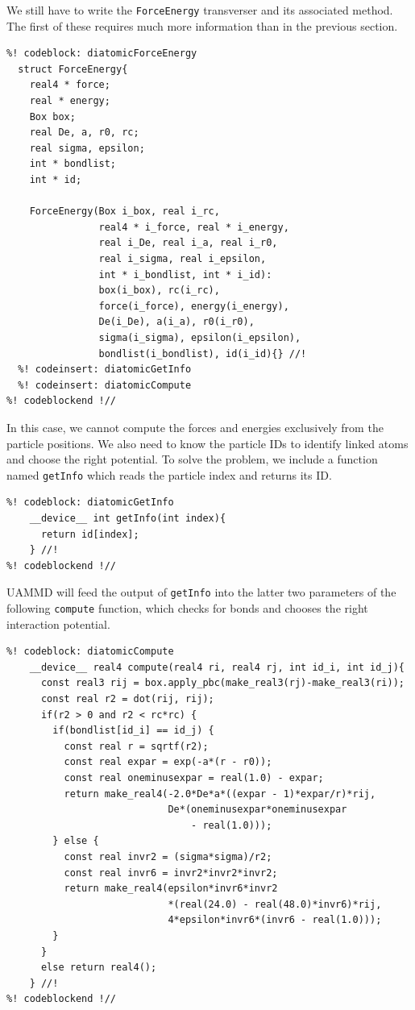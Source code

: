 We still have to write the \texttt{ForceEnergy} transverser and its associated
method. The first of these requires much more information than in the previous
section.
\begin{lstlisting}
%! codeblock: diatomicForceEnergy
  struct ForceEnergy{
    real4 * force;
    real * energy;
    Box box;
    real De, a, r0, rc;
    real sigma, epsilon;
    int * bondlist;
    int * id;

    ForceEnergy(Box i_box, real i_rc,
                real4 * i_force, real * i_energy,
                real i_De, real i_a, real i_r0,
                real i_sigma, real i_epsilon,
                int * i_bondlist, int * i_id):
                box(i_box), rc(i_rc),
                force(i_force), energy(i_energy),
                De(i_De), a(i_a), r0(i_r0),
                sigma(i_sigma), epsilon(i_epsilon),
                bondlist(i_bondlist), id(i_id){} //!
  %! codeinsert: diatomicGetInfo
  %! codeinsert: diatomicCompute
%! codeblockend !//
\end{lstlisting}
In this case, we cannot compute the forces and energies exclusively from the 
particle positions. We also need to know the particle IDs to identify linked
atoms and choose the right potential. To solve the problem, we include a 
function named \texttt{getInfo} which reads the particle index and returns its 
ID.
\begin{lstlisting}
%! codeblock: diatomicGetInfo
    __device__ int getInfo(int index){
      return id[index];
    } //!
%! codeblockend !//
\end{lstlisting}
UAMMD will feed the output of \texttt{getInfo} into the latter two parameters of 
the following \texttt{compute} function, which checks for bonds and chooses the 
right interaction potential.
\begin{lstlisting}
%! codeblock: diatomicCompute
    __device__ real4 compute(real4 ri, real4 rj, int id_i, int id_j){
      const real3 rij = box.apply_pbc(make_real3(rj)-make_real3(ri));
      const real r2 = dot(rij, rij);
      if(r2 > 0 and r2 < rc*rc) {
        if(bondlist[id_i] == id_j) {
          const real r = sqrtf(r2);
          const real expar = exp(-a*(r - r0));
          const real oneminusexpar = real(1.0) - expar;
          return make_real4(-2.0*De*a*((expar - 1)*expar/r)*rij,
                            De*(oneminusexpar*oneminusexpar
                                - real(1.0)));
        } else {
          const real invr2 = (sigma*sigma)/r2;
          const real invr6 = invr2*invr2*invr2;
          return make_real4(epsilon*invr6*invr2
                            *(real(24.0) - real(48.0)*invr6)*rij,
                            4*epsilon*invr6*(invr6 - real(1.0)));
        }
      }
      else return real4();
    } //!
%! codeblockend !//
\end{lstlisting}
